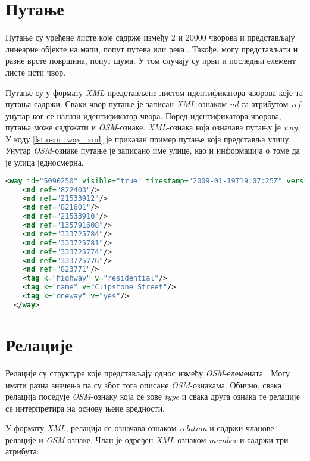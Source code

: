\documentclass[12pt,oneside]{memoir}
\begin{document}
\section{Путање}
\label{sec:osm_ways}

Путање су уређене листе које садрже између 2 и 20000 чворова и представљају линеарне објекте на мапи, попут путева или река \cite{osm_wiki}. Такође, могу представљати и разне врсте површина, попут шума. У том случају су први и последњи елемент листе исти чвор. 

Путање су у формату \textit{XML} представљене листом идентификатора чворова које та путања садржи. Сваки чвор путање је записан \textit{XML}-ознаком \textit{nd} са атрибутом \textit{ref} унутар ког се налази идентификатор чвора. Поред идентификатора чворова, путања може садржати и \textit{OSM}-ознаке. \textit{XML}-ознака која означава путању је \textit{way}. У коду \ref{lst:osm_way_xml} је приказан пример путање која представља улицу. Унутар \textit{OSM}-ознаке путање је записано име улице, као и информација о томе да је улица једносмерна.

\begin{lstlisting}[language=XML, caption={Запис \textit{XML} \textit{OSM}-путањe која представља улицу}, label={lst:osm_way_xml}]
<way id="5090250" visible="true" timestamp="2009-01-19T19:07:25Z" version="8" changeset="816806" user="Blumpsy" uid="64226">
    <nd ref="822403"/>
    <nd ref="21533912"/>
    <nd ref="821601"/>
    <nd ref="21533910"/>
    <nd ref="135791608"/>
    <nd ref="333725784"/>
    <nd ref="333725781"/>
    <nd ref="333725774"/>
    <nd ref="333725776"/>
    <nd ref="823771"/>
    <tag k="highway" v="residential"/>
    <tag k="name" v="Clipstone Street"/>
    <tag k="oneway" v="yes"/>
  </way>
\end{lstlisting}

\section{Релације}
\label{sec:osm_relations}

Релације су структуре које представљају однос између \textit{OSM}-елемената \cite{osm_wiki}. Могу имати разна значења па су због тога описане \textit{OSM}-ознакама. Обично, свака релација поседује \textit{OSM}-ознаку која се зове \textit{type} и свака друга ознака те релације се интерпретира на основу њене вредности.

У формату \textit{XML}, релација се означава ознаком \textit{relation} и садржи чланове релације и \textit{OSM}-ознаке. Члан је одређен \textit{XML}-ознаком \textit{member} и садржи три атрибута:
\end{document}

